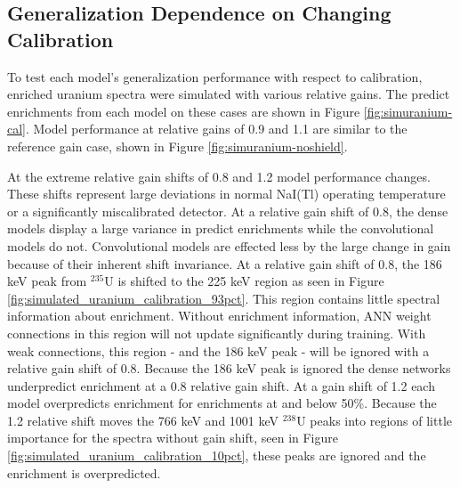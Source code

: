 \subsection{Generalization Dependence on Changing Calibration} \label{section_uranium_sim_cal}

To test each model's generalization performance with respect to calibration, enriched uranium spectra were simulated with various relative gains. The predict enrichments from each model on these cases are shown in Figure \ref{fig:simuranium-cal}. Model performance at relative gains of 0.9 and 1.1 are similar to the reference gain case, shown in Figure \ref{fig:simuranium-noshield}.

At the extreme relative gain shifts of 0.8 and 1.2 model performance changes. These shifts represent large deviations in normal NaI(Tl) operating temperature or a significantly miscalibrated detector.  At a relative gain shift of 0.8, the dense models display a large variance in predict enrichments while the convolutional models do not. Convolutional models are effected less by the large change in gain because of their inherent shift invariance. At a relative gain shift of 0.8, the 186 keV peak from $^{235}$U is shifted to the 225 keV region as seen in Figure \ref{fig:simulated_uranium_calibration_93pct}. This region contains little spectral information about enrichment. Without enrichment information, ANN weight connections in this region will not update significantly during training. With weak connections, this region - and the 186 keV peak - will be ignored with a relative gain shift of 0.8. Because the 186 keV peak is ignored the dense networks underpredict enrichment at a 0.8 relative gain shift. At a gain shift of 1.2 each model overpredicts enrichment for enrichments at and below 50\%. Because the 1.2 relative shift moves the 766 keV and 1001 keV $^{238}$U peaks into regions of little importance for the spectra without gain shift, seen in Figure \ref{fig:simulated_uranium_calibration_10pct}, these peaks are ignored and the enrichment is overpredicted.



